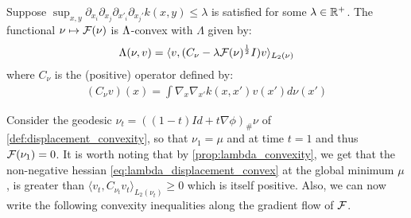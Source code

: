 \begin{proposition}
\label{prop:lambda_convexity} Suppose $\sup_{x,y} \partial_{x_{i}}\partial_{x_{j}}\partial_{x'_{i}}\partial_{x_{j}'}k(x,y)\le \lambda$ is satisfied for some $\lambda \in {{\mathbb R}}^+$. The functional $\nu\mapsto {{\mathcal F}}(\nu)$ is $\text{\ensuremath{\Lambda}}$-convex
with $\Lambda$ given by:
\begin{equation}
\Lambda(\nu,v)=\langle v,(C_{\nu}-\lambda {{\mathcal F}}(\nu)^{\frac{1}{2}}I)v\rangle_{L_{2}(\nu)}\label{eq:Lambda}
\end{equation}
where $C_{\nu}$ is the (positive) operator defined by:
\begin{align}\label{eq:positive_operator_C}
	(C_{\nu}v)(x)=\int\nabla_{x}\nabla_{x'}k(x,x')v(x')d\nu(x')
\end{align}
\end{proposition}
%
%
Consider the geodesic $\nu_{t}=((1-t)Id+t\nabla\phi)_{\#}\nu$ of \cref{def:displacement_convexity}, so that $\nu_{1}=\mu$ and at time $t=1$ and thus ${{\mathcal F}}(\nu_{1})=0$. It is worth noting that by \cref{prop:lambda_convexity}, we get that the non-negative hessian \eqref{eq:lambda_displacement_convex} at the global minimum $\mu$, is greater than $\langle v_{t},C_{\nu_{t}}v_{t}\rangle_{L_{2}(\nu_{t})}\geq0$ which is itself positive. Also, we can now write the following convexity inequalities along the gradient flow of ${{\mathcal F}}$.


